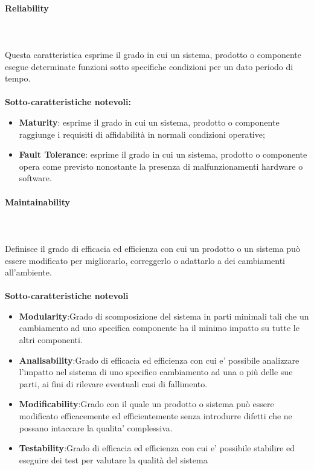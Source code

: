 \paragraph{Reliability}  ~\\ ~\\
Questa caratteristica esprime il grado in cui un sistema, prodotto o componente esegue determinate funzioni sotto specifiche condizioni per un dato periodo di tempo. \\ \\
\textbf{Sotto-caratteristiche notevoli:}
\begin{itemize}
	\item{\textbf{Maturity}}: esprime il grado in cui un sistema, prodotto o componente raggiunge i requisiti di affidabilità in normali condizioni operative;
	\item{\textbf{Fault Tolerance}}: esprime il grado in cui un sistema, prodotto o componente opera come previsto nonostante la presenza di malfunzionamenti hardware o software.
\end{itemize}

\paragraph{Maintainability} ~\\ ~\\
Definisce il grado di efficacia ed efficienza con cui un prodotto o un sistema può essere modificato per migliorarlo, correggerlo o adattarlo a dei cambiamenti all'ambiente. \\ \\
\textbf{Sotto-caratteristiche notevoli}
\begin{itemize}
	\item{\textbf{Modularity}}:Grado di scomposizione del sistema in parti minimali tali che un cambiamento ad uno specifica componente ha il minimo impatto su tutte le altri componenti.
	\item{\textbf{Analisability}}:Grado di efficacia ed efficienza con cui e' possibile analizzare l'impatto nel sistema di uno specifico cambiamento ad una o più delle sue parti, ai fini di rilevare eventuali casi di fallimento.
	\item{\textbf{Modificability}}:Grado con il quale un prodotto o sistema può essere modificato efficacemente ed efficientemente senza introdurre difetti che ne possano intaccare la qualita' complessiva.
	\item{\textbf{Testability}}:Grado di efficacia ed efficienza con cui e' possibile stabilire ed eseguire dei test per valutare la qualità del sistema
\end{itemize}

